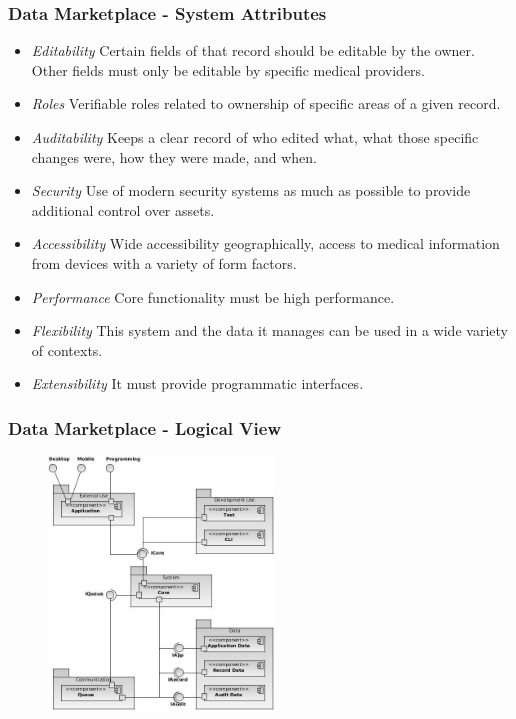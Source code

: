 \documentclass[t, 10pt]{beamer}
\begin{document}
\begin{frame}
\frametitle{Data Marketplace - System Attributes}

\begin{itemize}

\item \textit{Editability} Certain fields of that record should be editable by the owner.  Other fields must only be editable by specific medical providers.

\item \textit{Roles} Verifiable roles related to ownership of specific areas of a given record.

\item \textit{Auditability} Keeps a clear record of who edited what, what those specific changes were, how they were made, and when. 

\item \textit{Security} Use of modern security systems as much as possible to provide additional control over assets. 

\item \textit{Accessibility} Wide accessibility geographically, access to medical information from devices with a variety of form factors.

\item \textit{Performance} Core functionality must be high performance.

\item \textit{Flexibility} This system and the data it manages can be used in a wide variety of contexts.

\item \textit{Extensibility} It must provide programmatic interfaces.

\end{itemize}

\end{frame}

\begin{frame}
\frametitle{Data Marketplace - Logical View}

\begin{figure}
\includegraphics[width = 6cm]{HisbSystemArch}
\end{figure}

\end{frame}
\end{document}
